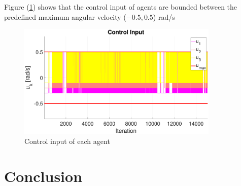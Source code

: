 \documentclass[journal]{IEEEtran}
\begin{document}
	Figure (\ref{fig:u_k}) shows that the control input of agents are bounded between the predefined maximum angular velocity ($-0.5, 0.5$) rad/s
	
	\begin{figure}[H]
		\centering
		\includegraphics[width=9.6cm]{u_k}
		\caption{Control input of each agent}
		\label{fig:u_k}
	\end{figure}
	
	\section{Conclusion} \label{section:conclusion}
	
	\appendices
\end{document}
